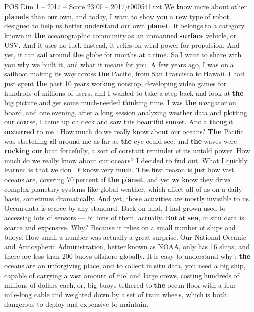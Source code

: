 \begin{textsample}{POS Dim 1 – 2017 – Score 23.00 – 2017/t000541.txt}  \label{ex:f1_pos_056}
We know more about other \textbf{planets} than our own, and today, I want to show you a new type of robot designed to help us better understand our own \textbf{planet}.
It belongs to a category known in \textbf{the} oceanographic community as an unmanned \textbf{surface} vehicle, or USV.
And it uses no fuel.
Instead, it relies on wind power for propulsion.
And yet, it can sail around \textbf{the} globe for months at a time.
So I want to share with you why we built it, and what it means for you.
A few years ago, I was on a sailboat making its way across \textbf{the} Pacific, from San Francisco to Hawaii.
I had just spent \textbf{the} past 10 years working nonstop, developing video games for hundreds of millions of users, and I wanted to take a step back and look at \textbf{the} big picture and get some much-needed thinking time.
I was \textbf{the} navigator on board, and one evening, after a long session analyzing weather data and plotting our course, I came up on deck and saw this beautiful sunset.
And a thought \textbf{occurred} to me : How much do we really know about our oceans? \textbf{The} Pacific was stretching all around me as far as \textbf{the} eye could see, and \textbf{the} waves were \textbf{rocking} our boat forcefully, a sort of constant reminder of its untold power.
How much do we really know about our oceans?
I decided to find out.
What I quickly learned is that we don ' t know very much. \textbf{The} first reason is just how vast oceans are, covering 70 percent of \textbf{the} \textbf{planet}, and yet we know they drive complex planetary systems like global weather, which affect all of us on a daily basis, sometimes dramatically.
And yet, those activities are mostly invisible to us.
Ocean data is scarce by any standard.
Back on land, I had grown used to accessing lots of sensors — billions of them, actually.
But at \textbf{sea}, in situ data is scarce and expensive.
Why?
Because it relies on a small number of ships and buoys.
How small a number was actually a great surprise.
Our National Oceanic and Atmospheric Administration, better known as NOAA, only has 16 ships, and there are less than 200 buoys offshore globally.
It is easy to understand why : \textbf{the} oceans are an unforgiving place, and to collect in situ data, you need a big ship, capable of carrying a vast amount of fuel and large crews, costing hundreds of millions of dollars each, or, big buoys tethered to \textbf{the} ocean floor with a four-mile-long cable and weighted down by a set of train wheels, which is both dangerous to deploy and expensive to maintain.

\end{textsample}
